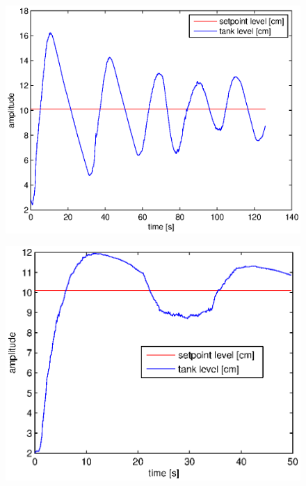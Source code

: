 \documentclass[frenchb, paper=a4, fontsize=11pt]{scrartcl}
\numberwithin{equation}{section}					%
\numberwithin{figure}{section}					%
\numberwithin{table}{section}						%
\begin{document}
\begin{figure}[!ht]
\centering
\begin{minipage}{.5\textwidth}
  \centering
  \includegraphics[width=.99\linewidth]{img/cl-3-1.eps}
  \label{fig:test3}
\end{minipage}%
\begin{minipage}{.5\textwidth}
  \centering
  \includegraphics[width=.99\linewidth]{img/cl-10-0_1.eps}
  \label{fig:test4}
\end{minipage}
\end{figure}
\end{document}
